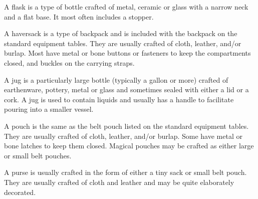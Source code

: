 \begin{multicols}{2}
A flask is a type of bottle crafted of metal, ceramic or glass with a narrow neck and a flat base.  It most often includes a stopper.

A haversack is a type of backpack and is included with the backpack on the standard equipment tables.  They are usually crafted of cloth, leather, and/or burlap.  Most have metal or bone buttons or fasteners to keep the compartments closed, and buckles on the carrying straps.

A jug is a particularly large bottle (typically a gallon or more) crafted of earthenware, pottery, metal or glass and sometimes sealed with either a lid or a cork.  A jug is used to contain liquids and usually has a handle to facilitate pouring into a smaller vessel.

A pouch is the same as the belt pouch listed on the standard equipment tables.  They are usually crafted of cloth, leather, and/or burlap.  Some have metal or bone latches to keep them closed.  Magical pouches may be crafted as either large or small belt pouches. 

A purse is usually crafted in the form of either a tiny sack or small belt pouch.  They are usually crafted of cloth and leather and may be quite elaborately decorated.

\noindent \begin{minipage}{\columnwidth}


\end{minipage}
\end{multicols}

